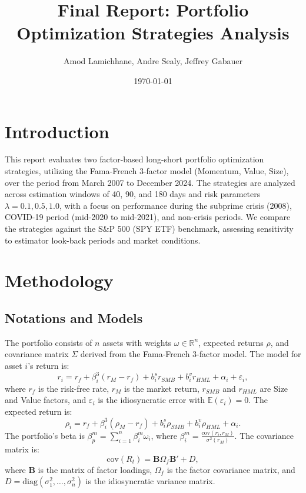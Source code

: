 \documentclass[12pt]{article}
\title{Final Report: Portfolio Optimization Strategies Analysis}
\author{Amod Lamichhane, Andre Sealy, Jeffrey Gabauer}
\date{\today}
\begin{document}
\maketitle

\newpage

\section{Introduction}
This report evaluates two factor-based long-short portfolio optimization strategies, utilizing the Fama-French 3-factor model (Momentum, Value, Size), over the period from March 2007 to December 2024. The strategies are analyzed across estimation windows of 40, 90, and 180 days and risk parameters $\lambda = 0.1, 0.5, 1.0$, with a focus on performance during the subprime crisis (2008), COVID-19 period (mid-2020 to mid-2021), and non-crisis periods. We compare the strategies against the S\&P 500 (SPY ETF) benchmark, assessing sensitivity to estimator look-back periods and market conditions.

\section{Methodology}

\subsection{Notations and Models}
The portfolio consists of $n$ assets with weights $\omega \in \mathbb{R}^n$, expected returns $\rho$, and covariance matrix $\Sigma$ derived from the Fama-French 3-factor model. The model for asset $i$'s return is:
\[
r_i = r_f + \beta_i^3 (r_M - r_f) + b_i^s r_{SMB} + b_i^v r_{HML} + \alpha_i + \varepsilon_i,
\]
where $r_f$ is the risk-free rate, $r_M$ is the market return, $r_{SMB}$ and $r_{HML}$ are Size and Value factors, and $\varepsilon_i$ is the idiosyncratic error with $\mathbb{E}(\varepsilon_i) = 0$. The expected return is:
\[
\rho_i = r_f + \beta_i^3 (\rho_M - r_f) + b_i^s \rho_{SMB} + b_i^v \rho_{HML} + \alpha_i.
\]
The portfolio's beta is $\beta_p^m = \sum_{i=1}^n \beta_i^m \omega_i$, where $\beta_i^m = \frac{\text{cov}(r_i, r_M)}{\sigma^2(r_M)}$. The covariance matrix is:
\[
\text{cov}(R_t) = \mathbf{B} \Omega_f \mathbf{B}' + D,
\]
where $\mathbf{B}$ is the matrix of factor loadings, $\Omega_f$ is the factor covariance matrix, and $D = \text{diag}(\sigma_1^2, \ldots, \sigma_n^2)$ is the idiosyncratic variance matrix.
\end{document}
